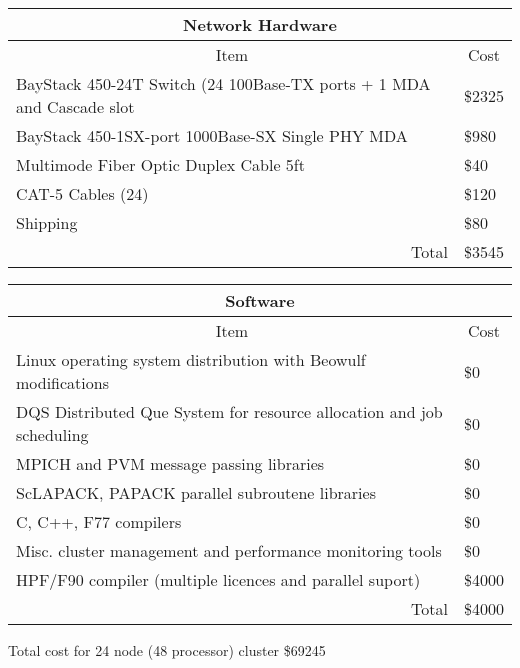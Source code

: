 \newline
\begin{tabular}
[c]{|c|c|}\hline\hline
\multicolumn{2}{|c|}{Network Hardware}\\\hline\hline
Item & Cost\\
\multicolumn{1}{|l|}{BayStack 450-24T Switch (24 100Base-TX ports + 1 MDA and
Cascade slot} & \multicolumn{1}{|l|}{\$2325}\\
\multicolumn{1}{|l|}{BayStack 450-1SX-port 1000Base-SX Single PHY MDA} &
\multicolumn{1}{|l|}{\$980}\\
\multicolumn{1}{|l|}{Multimode Fiber Optic Duplex Cable 5ft} &
\multicolumn{1}{|l|}{\$40}\\
\multicolumn{1}{|l|}{CAT-5 Cables (24)} & \multicolumn{1}{|l|}{\$120}\\\hline
\multicolumn{1}{|l|}{Shipping} & \multicolumn{1}{|l|}{\$80}\\\hline
\multicolumn{1}{|r|}{Total} & \multicolumn{1}{|l|}{\$3545}\\\hline
\end{tabular}

\bigskip%
\begin{tabular}
[c]{|c|c|}\hline\hline
\multicolumn{2}{|c|}{Software}\\\hline\hline
Item & Cost\\
\multicolumn{1}{|l|}{Linux operating system distribution with Beowulf
modifications} & \multicolumn{1}{|l|}{\$0}\\
\multicolumn{1}{|l|}{DQS Distributed Que System for resource allocation and
job scheduling} & \multicolumn{1}{|l|}{\$0}\\
\multicolumn{1}{|l|}{MPICH and PVM message passing libraries} &
\multicolumn{1}{|l|}{\$0}\\
\multicolumn{1}{|l|}{ScLAPACK, PAPACK parallel subroutene libraries} &
\multicolumn{1}{|l|}{\$0}\\
\multicolumn{1}{|l|}{C, C++, F77 compilers} & \multicolumn{1}{|l|}{\$0}%
\\\hline
\multicolumn{1}{|l|}{Misc. cluster management and performance monitoring
tools} & \multicolumn{1}{|l|}{\$0}\\\hline
\multicolumn{1}{|l|}{HPF/F90 compiler (multiple licences and parallel suport)}%
& \multicolumn{1}{|l|}{\$4000}\\\hline
\multicolumn{1}{|r|}{Total} & \multicolumn{1}{|l|}{\$4000}\\\hline
\end{tabular}

\bigskip

Total cost for 24 node (48 processor) cluster \$69245






